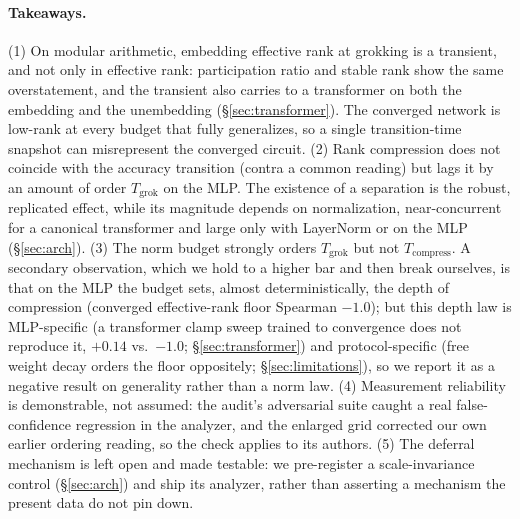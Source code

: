 \documentclass[11pt]{article}
\begin{document}
\paragraph{Takeaways.} (1) On modular arithmetic, embedding effective rank at grokking is a
transient, and not only in effective rank: participation ratio and stable rank show the same
overstatement, and the transient also carries to a transformer on both the embedding and the
unembedding (\S\ref{sec:transformer}). The converged network is low-rank at every budget that fully
generalizes, so a single transition-time snapshot can misrepresent the converged circuit. (2) Rank compression does not coincide
with the accuracy transition (contra a common reading) but lags it by an amount of order
$T_{\mathrm{grok}}$ on the MLP. The existence of a separation is the robust, replicated effect, while its magnitude depends on normalization, near-concurrent for a canonical transformer and large only with LayerNorm or on the MLP (\S\ref{sec:arch}). (3) The
norm budget strongly orders $T_{\mathrm{grok}}$ but not $T_{\mathrm{compress}}$. A secondary
observation, which we hold to a higher bar and then break ourselves, is that on the MLP the budget sets,
almost deterministically, the depth of compression (converged effective-rank floor Spearman
$-1.0$); but this depth law is MLP-specific (a transformer clamp sweep trained to convergence does not
reproduce it, $+0.14$ vs.\ $-1.0$; \S\ref{sec:transformer}) and protocol-specific (free weight decay
orders the floor oppositely; \S\ref{sec:limitations}), so we report it as a negative result on generality
rather than a norm law. (4) Measurement reliability is demonstrable, not
assumed: the audit's adversarial suite caught a real false-confidence regression in the analyzer, and
the enlarged grid corrected our own earlier ordering reading, so the check applies to its authors. (5) The deferral mechanism is left open and made testable: we pre-register a scale-invariance control (\S\ref{sec:arch}) and ship its analyzer, rather than asserting a mechanism the present data do not pin down.
\end{document}
